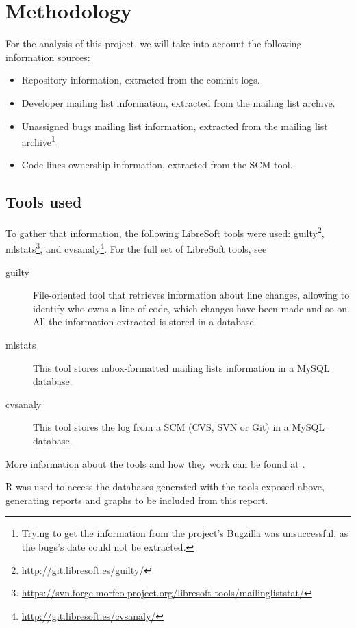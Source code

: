 \documentclass[12pt]{article}
\begin{document}
\section{Methodology}

For the analysis of this project, we will take into account the following information sources:
\begin{itemize}
\item Repository information, extracted from the commit logs.
\item Developer mailing list information, extracted from the mailing list archive.
\item Unassigned bugs mailing list information, extracted from the mailing list archive\footnote{Trying to get the information from the project's Bugzilla was unsuccessful, as the bugs's date could not be extracted.}
\item Code lines ownership information, extracted from the SCM tool.
\end{itemize}

\subsection{Tools used}

To gather that information, the following LibreSoft tools were used: guilty\footnote{\url{http://git.libresoft.es/guilty/}}, mlstats\footnote{\url{https://svn.forge.morfeo-project.org/libresoft-tools/mailingliststat/}}, and cvsanaly\footnote{\url{http://git.libresoft.es/cvsanaly/}}. For the full set of LibreSoft tools, see \cite{libresoft:tools}

\begin{description}
\item[guilty] File-oriented tool that retrieves information about line changes, allowing to identify who owns a line of code, which changes have been made and so on. All the information extracted is stored in a database.
\item[mlstats] This tool stores mbox-formatted mailing lists information in a MySQL database.
\item[cvsanaly] This tool stores the log from a SCM (CVS, SVN or Git) in a MySQL database.
\end{description}

More information about the tools and how they work can be found at \cite{melquiades:libresoft_tools, moodle:libresoft_tools}.

R\cite{r:citation} was used to access the databases generated with the tools exposed above, generating reports and graphs to be included from this report.  
\end{document}
